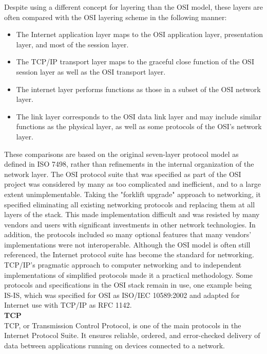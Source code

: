 \documentclass{article}
\begin{document}
Despite using a different concept for layering than the OSI model, these layers are often compared with the OSI layering scheme in the following manner: 
\begin{itemize}
\item The Internet application layer maps to the OSI application layer, presentation layer, and most of the session layer.
\item The TCP/IP transport layer maps to the graceful close function of the OSI session layer as well as the OSI transport layer.
\item The internet layer performs functions as those in a subset of the OSI network layer.
\item The link layer corresponds to the OSI data link layer and may include similar functions as the physical layer, as well as some protocols of the OSI's network layer.
\end{itemize}

	These comparisons are based on the original seven-layer protocol model as defined in ISO 7498, rather than refinements in the internal organization of the network layer. The OSI protocol suite that was specified as part of the OSI project was considered by many as too complicated and inefficient, and to a large extent unimplementable. Taking the "forklift upgrade" approach to networking, it specified eliminating all existing networking protocols and replacing them at all layers of the stack. This made implementation difficult and was resisted by many vendors and users with significant investments in other network technologies. In addition, the protocols included so many optional features that many vendors' implementations were not interoperable. Although the OSI model is often still referenced, the Internet protocol suite has become the standard for networking. TCP/IP's pragmatic approach to computer networking and to independent implementations of simplified protocols made it a practical methodology. Some protocols and specifications in the OSI stack remain in use, one example being IS-IS, which was specified for OSI as ISO/IEC 10589:2002 and adapted for Internet use with TCP/IP as RFC 1142.\\

\textbf{TCP}\\

TCP, or Transmission Control Protocol, is one of the main protocols in the Internet Protocol Suite. It ensures reliable, ordered, and error-checked delivery of data between applications running on devices connected to a network.
\end{document}
